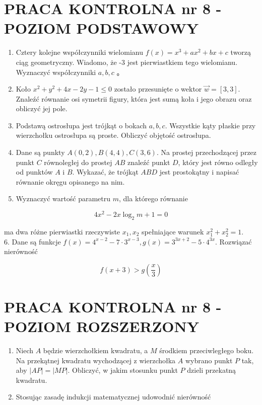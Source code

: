 \documentclass[10pt]{article}
\begin{document}
\section*{PRACA KONTROLNA nr 8 - POZIOM PODSTAWOWY}
\begin{enumerate}
  \item Cztery kolejne współczynniki wielomianu $f(x)=x^{3}+a x^{2}+b x+c$ tworzą ciąg geometryczny. Wiadomo, że -3 jest pierwiastkiem tego wielomianu. Wyznaczyć współczynniki $a, b, c$ 。
  \item Koło $x^{2}+y^{2}+4 x-2 y-1 \leqslant 0$ zostało przesunięte o wektor $\vec{w}=[3,3]$. Znaleźć równanie osi symetrii figury, która jest sumą koła i jego obrazu oraz obliczyć jej pole.
  \item Podstawą ostrosłupa jest trójkąt o bokach $a, b, c$. Wszystkie kąty płaskie przy wierzchołku ostrosłupa są proste. Obliczyć objętość ostrosłupa.
  \item Dane są punkty $A(0,2), B(4,4), C(3,6)$. Na prostej przechodzącej przez punkt $C$ równoległej do prostej $A B$ znaleźć punkt $D$, który jest równo odległy od punktów $A$ i $B$. Wykazać, że trójkąt $A B D$ jest prostokątny i napisać równanie okręgu opisanego na nim.
  \item Wyznaczyć wartość parametru $m$, dla którego równanie
\end{enumerate}

$$
4 x^{2}-2 x \log _{2} m+1=0
$$

ma dwa różne pierwiastki rzeczywiste $x_{1}, x_{2}$ spełniające warunek $x_{1}^{2}+x_{2}^{2}=1$.\\
6. Dane są funkcje $f(x)=4^{x-2}-7 \cdot 3^{x-3}, g(x)=3^{3 x+2}-5 \cdot 4^{3 x}$. Rozwiązać nierówność

$$
f(x+3)>g\left(\frac{x}{3}\right)
$$

\section*{PRACA KONTROLNA nr 8 - POZIOM ROZSZERZONY}
\begin{enumerate}
  \item Niech $A$ będzie wierzchołkiem kwadratu, a $M$ środkiem przeciwległego boku. Na przekątnej kwadratu wychodzącej z wierzchołka $A$ wybrano punkt $P$ tak, aby $|A P|=|M P|$. Obliczyć, w jakim stosunku punkt $P$ dzieli przekatną kwadratu.
  \item Stosując zasadę indukcji matematycznej udowodnić nierówność
\end{enumerate}
\end{document}
